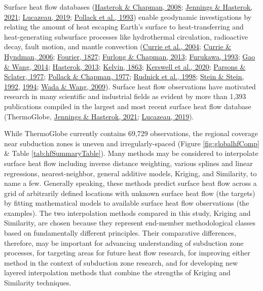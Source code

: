 Surface heat flow databases (\protect\hyperlink{ref-hasterok2008}{Hasterok \& Chapman, 2008}; \protect\hyperlink{ref-jennings2021}{Jennings \& Hasterok, 2021}; \protect\hyperlink{ref-lucazeau2019}{Lucazeau, 2019}; \protect\hyperlink{ref-pollack1993}{Pollack et al., 1993}) enable geodynamic investigations by relating the amount of heat escaping Earth's surface to heat-transferring and heat-generating subsurface processes like hydrothermal circulation, radioactive decay, fault motion, and mantle convection (\protect\hyperlink{ref-currie2004}{Currie et al., 2004}; \protect\hyperlink{ref-currie2006}{Currie \& Hyndman, 2006}; \protect\hyperlink{ref-fourier1827}{Fourier, 1827}; \protect\hyperlink{ref-furlong2013}{Furlong \& Chapman, 2013}; \protect\hyperlink{ref-furukawa1993}{Furukawa, 1993}; \protect\hyperlink{ref-gao2014}{Gao \& Wang, 2014}; \protect\hyperlink{ref-hasterok2013}{Hasterok, 2013}; \protect\hyperlink{ref-kelvin1863}{Kelvin, 1863}; \protect\hyperlink{ref-kerswell2020}{Kerswell et al., 2020}; \protect\hyperlink{ref-parsons1977}{Parsons \& Sclater, 1977}; \protect\hyperlink{ref-pollack1977}{Pollack \& Chapman, 1977}; \protect\hyperlink{ref-rudnick1998}{Rudnick et al., 1998}; \protect\hyperlink{ref-stein1992}{Stein \& Stein, 1992}, \protect\hyperlink{ref-stein1994}{1994}; \protect\hyperlink{ref-wada2009}{Wada \& Wang, 2009}). Surface heat flow observations have motivated research in many scientific and industrial fields as evident by more than 1,393 publications compiled in the largest and most recent surface heat flow database (ThermoGlobe, \protect\hyperlink{ref-jennings2021}{Jennings \& Hasterok, 2021}; \protect\hyperlink{ref-lucazeau2019}{Lucazeau, 2019}).

While ThermoGlobe currently contains 69,729 observations, the regional coverage near subduction zones is uneven and irregularly-spaced (Figure \ref{fig:globalhfComp} \& Table \ref{tab:hfSummaryTable}). Many methods may be considered to interpolate surface heat flow including inverse distance weighting, various splines and linear regressions, nearest-neighbor, general additive models, Kriging, and Similarity, to name a few. Generally speaking, these methods predict surface heat flow across a grid of arbitrarily defined locations with unknown surface heat flow (the targets) by fitting mathematical models to available surface heat flow observations (the examples). The two interpolation methods compared in this study, Kriging and Similarity, are chosen because they represent end-member methodological classes based on fundamentally different principles. Their comparative differences, therefore, may be important for advancing understanding of subduction zone processes, for targeting areas for future heat flow research, for improving either method in the context of subduction zone research, and for developing new layered interpolation methods that combine the strengths of Kriging and Similarity techniques.



